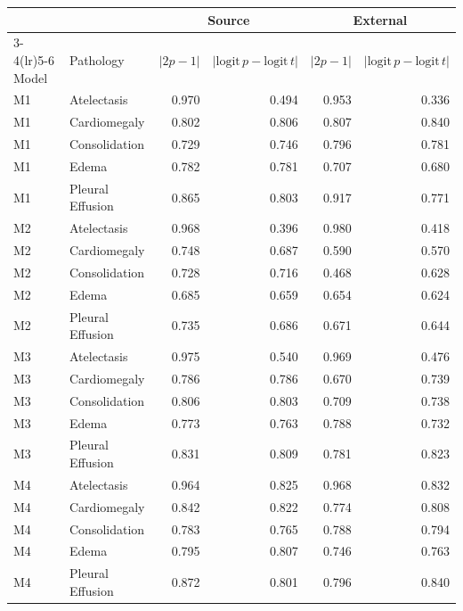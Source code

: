 \begin{tabular}{llrrrr}
\toprule
 & & \multicolumn{2}{c}{Source} & \multicolumn{2}{c}{External}\\
\cmidrule(lr){3-4}\cmidrule(lr){5-6}
Model & Pathology & $|2p-1|$ & $|\mathrm{logit}\,p-\mathrm{logit}\,t|$ & $|2p-1|$ & $|\mathrm{logit}\,p-\mathrm{logit}\,t|$\\
\midrule
M1 & Atelectasis & 0.970 & 0.494 & 0.953 & 0.336\\
M1 & Cardiomegaly & 0.802 & 0.806 & 0.807 & 0.840\\
M1 & Consolidation & 0.729 & 0.746 & 0.796 & 0.781\\
M1 & Edema & 0.782 & 0.781 & 0.707 & 0.680\\
M1 & Pleural Effusion & 0.865 & 0.803 & 0.917 & 0.771\\
M2 & Atelectasis & 0.968 & 0.396 & 0.980 & 0.418\\
M2 & Cardiomegaly & 0.748 & 0.687 & 0.590 & 0.570\\
M2 & Consolidation & 0.728 & 0.716 & 0.468 & 0.628\\
M2 & Edema & 0.685 & 0.659 & 0.654 & 0.624\\
M2 & Pleural Effusion & 0.735 & 0.686 & 0.671 & 0.644\\
M3 & Atelectasis & 0.975 & 0.540 & 0.969 & 0.476\\
M3 & Cardiomegaly & 0.786 & 0.786 & 0.670 & 0.739\\
M3 & Consolidation & 0.806 & 0.803 & 0.709 & 0.738\\
M3 & Edema & 0.773 & 0.763 & 0.788 & 0.732\\
M3 & Pleural Effusion & 0.831 & 0.809 & 0.781 & 0.823\\
M4 & Atelectasis & 0.964 & 0.825 & 0.968 & 0.832\\
M4 & Cardiomegaly & 0.842 & 0.822 & 0.774 & 0.808\\
M4 & Consolidation & 0.783 & 0.765 & 0.788 & 0.794\\
M4 & Edema & 0.795 & 0.807 & 0.746 & 0.763\\
M4 & Pleural Effusion & 0.872 & 0.801 & 0.796 & 0.840\\
\bottomrule
\end{tabular}
